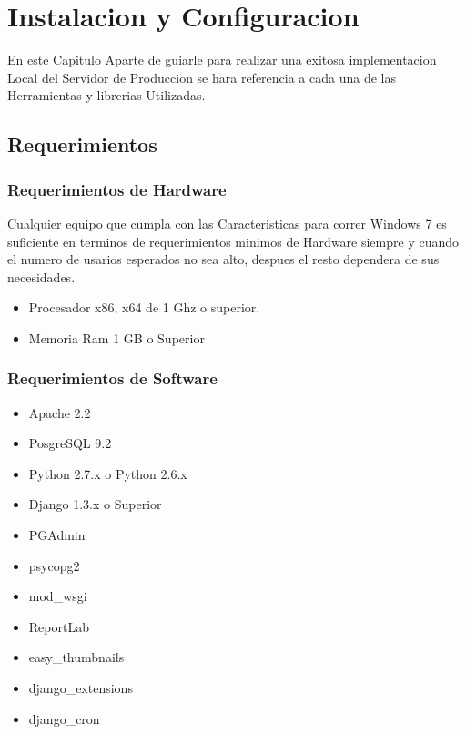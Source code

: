\chapter{Instalacion y Configuracion}

En este Capitulo Aparte de guiarle para realizar una exitosa implementacion
Local del Servidor de Produccion se hara referencia a cada una de las
Herramientas y librerias Utilizadas.

\section{Requerimientos}

\subsection{Requerimientos de Hardware}

Cualquier equipo que cumpla con las Caracteristicas para correr Windows 7 es suficiente
en terminos de requerimientos minimos de Hardware siempre y cuando el numero de usarios
esperados no sea alto, despues el resto dependera de sus necesidades.\\[0.5cm]

\begin{itemize}
    \item Procesador x86, x64 de 1 Ghz o superior.
    \item Memoria Ram 1 GB o Superior 
\end{itemize}


\subsection{Requerimientos de Software}


\begin{itemize}
    \item Apache 2.2
    \item PosgreSQL 9.2
    \item Python 2.7.x o Python 2.6.x
    \item Django 1.3.x o Superior
    \item PGAdmin
    \item psycopg2
    \item mod\_wsgi
    \item ReportLab
    \item easy\_thumbnails
    \item django\_extensions
    \item django\_cron
\end{itemize}



